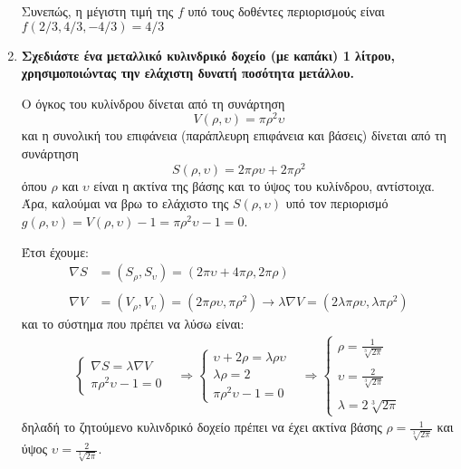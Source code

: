 \begin{enumerate}
        Συνεπώς, η μέγιστη τιμή της $f$ υπό τους δοθέντες περιορισμούς είναι $f(2/3, 4/3, -4/3) = 4/3$
    \item \textbf{Σχεδιάστε ένα μεταλλικό κυλινδρικό δοχείο (με καπάκι) 1 λίτρου, χρησιμοποιώντας την ελάχιστη δυνατή ποσότητα μετάλλου.}
    
        Ο όγκος του κυλίνδρου δίνεται από τη συνάρτηση $$V(\rho, \upsilon) = \pi \rho^2 \upsilon$$ και η συνολική του επιφάνεια (παράπλευρη επιφάνεια και βάσεις) δίνεται από τη συνάρτηση $$S(\rho, \upsilon) = 2 \pi \rho \upsilon + 2 \pi \rho^2$$ όπου $\rho$ και $\upsilon$ είναι η ακτίνα της βάσης και το ύψος του κυλίνδρου, αντίστοιχα. Άρα, καλούμαι να βρω το ελάχιστο της $S(\rho, \upsilon)$ υπό τον περιορισμό $g(\rho, \upsilon) = V(\rho, \upsilon) - 1 = \pi \rho^2 \upsilon - 1 = 0$.
        
        Έτσι έχουμε:
        \begin{align*}
            \nabla S &= (S_{\rho}, S_{\upsilon}) = (2\pi \upsilon + 4 \pi \rho , 2\pi \rho) \\\\
            \nabla V &= (V_{\rho}, V_{\upsilon}) = (2\pi \rho \upsilon, \pi \rho^2) \longrightarrow \lambda \nabla V = (2 \lambda \pi \rho \upsilon,  \lambda \pi \rho^2)
        \end{align*}
        και το σύστημα που πρέπει να λύσω είναι:
        \begin{align*}
            \begin{cases}
                \nabla S = \lambda \nabla V \\
                \pi \rho^2 \upsilon - 1 = 0
            \end{cases} &\Rightarrow
            \begin{cases}
                \upsilon + 2 \rho = \lambda \rho \upsilon \\
                \lambda \rho = 2 \\
                \pi \rho^2 \upsilon - 1 = 0
            \end{cases} &\Rightarrow
            \begin{cases}
                \displaystyle \rho = \frac{1}{\sqrt[3]{2\pi}} \\\\
                \displaystyle \upsilon = \frac{2}{\sqrt[3]{2\pi}} \\\\
                \lambda = 2 \sqrt[3]{2\pi}
            \end{cases}
        \end{align*}
        δηλαδή το ζητούμενο κυλινδρικό δοχείο πρέπει να έχει ακτίνα βάσης $\displaystyle \rho = \frac{1}{\sqrt[3]{2\pi}}$ και ύψος $\displaystyle \upsilon = \frac{2}{\sqrt[3]{2\pi}}$.
\end{enumerate}















